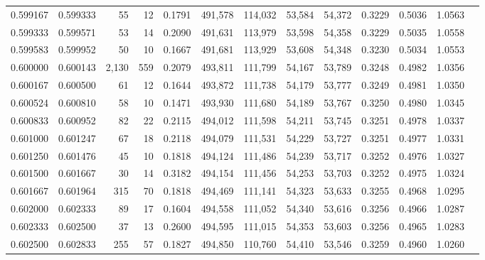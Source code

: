 \begin{tabular}{rrrrrrrrrrrrr}
0.599167 & 0.599333 &    55 &  12 &                                     0.1791 & 491,578 & 114,032 &  53,584 &  54,372 & 0.3229 & 0.5036 & 1.0563 \\
0.599333 & 0.599571 &    53 &  14 &                                     0.2090 & 491,631 & 113,979 &  53,598 &  54,358 & 0.3229 & 0.5035 & 1.0558 \\
0.599583 & 0.599952 &    50 &  10 &                                     0.1667 & 491,681 & 113,929 &  53,608 &  54,348 & 0.3230 & 0.5034 & 1.0553 \\
0.600000 & 0.600143 & 2,130 & 559 &                                     0.2079 & 493,811 & 111,799 &  54,167 &  53,789 & 0.3248 & 0.4982 & 1.0356 \\
0.600167 & 0.600500 &    61 &  12 &                                     0.1644 & 493,872 & 111,738 &  54,179 &  53,777 & 0.3249 & 0.4981 & 1.0350 \\
0.600524 & 0.600810 &    58 &  10 &                                     0.1471 & 493,930 & 111,680 &  54,189 &  53,767 & 0.3250 & 0.4980 & 1.0345 \\
0.600833 & 0.600952 &    82 &  22 &                                     0.2115 & 494,012 & 111,598 &  54,211 &  53,745 & 0.3251 & 0.4978 & 1.0337 \\
0.601000 & 0.601247 &    67 &  18 &                                     0.2118 & 494,079 & 111,531 &  54,229 &  53,727 & 0.3251 & 0.4977 & 1.0331 \\
0.601250 & 0.601476 &    45 &  10 &                                     0.1818 & 494,124 & 111,486 &  54,239 &  53,717 & 0.3252 & 0.4976 & 1.0327 \\
0.601500 & 0.601667 &    30 &  14 &                                     0.3182 & 494,154 & 111,456 &  54,253 &  53,703 & 0.3252 & 0.4975 & 1.0324 \\
0.601667 & 0.601964 &   315 &  70 &                                     0.1818 & 494,469 & 111,141 &  54,323 &  53,633 & 0.3255 & 0.4968 & 1.0295 \\
0.602000 & 0.602333 &    89 &  17 &                                     0.1604 & 494,558 & 111,052 &  54,340 &  53,616 & 0.3256 & 0.4966 & 1.0287 \\
0.602333 & 0.602500 &    37 &  13 &                                     0.2600 & 494,595 & 111,015 &  54,353 &  53,603 & 0.3256 & 0.4965 & 1.0283 \\
0.602500 & 0.602833 &   255 &  57 &                                     0.1827 & 494,850 & 110,760 &  54,410 &  53,546 & 0.3259 & 0.4960 & 1.0260 \\

\end{tabular}
